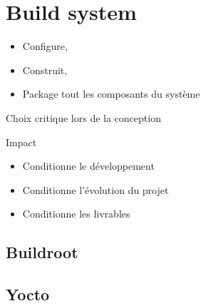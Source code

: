\section{Build system}
\begin{frame}
	\begin{itemize}
		\item Configure,
		\item Construit,
		\item Package tout les composants du système
	\end{itemize}
Choix critique lors de la conception
\begin{block}{Impact}
	\begin{itemize}
		\item Conditionne le développement
		\item Conditionne l'évolution du projet
		\item Conditionne les livrables
	\end{itemize}
\end{block}
\end{frame}
\subsection{Buildroot}
\subsection{Yocto}
